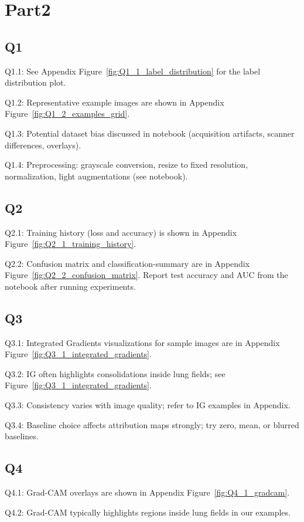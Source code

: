 \section*{Part2}
\subsection*{Q1}
Q1.1: See Appendix Figure~\ref{fig:Q1_1_label_distribution} for the label distribution plot.

Q1.2: Representative example images are shown in Appendix Figure~\ref{fig:Q1_2_examples_grid}.

Q1.3: Potential dataset bias discussed in notebook (acquisition artifacts, scanner differences, overlays).

Q1.4: Preprocessing: grayscale conversion, resize to fixed resolution, normalization, light augmentations (see notebook).

\subsection*{Q2}
Q2.1: Training history (loss and accuracy) is shown in Appendix Figure~\ref{fig:Q2_1_training_history}.

Q2.2: Confusion matrix and classification-summary are in Appendix Figure~\ref{fig:Q2_2_confusion_matrix}. Report test accuracy and AUC from the notebook after running experiments.

\subsection*{Q3}
Q3.1: Integrated Gradients visualizations for sample images are in Appendix Figure~\ref{fig:Q3_1_integrated_gradients}.

Q3.2: IG often highlights consolidations inside lung fields; see Figure~\ref{fig:Q3_1_integrated_gradients}.

Q3.3: Consistency varies with image quality; refer to IG examples in Appendix.

Q3.4: Baseline choice affects attribution maps strongly; try zero, mean, or blurred baselines.

\subsection*{Q4}
Q4.1: Grad-CAM overlays are shown in Appendix Figure~\ref{fig:Q4_1_gradcam}.

Q4.2: Grad-CAM typically highlights regions inside lung fields in our examples.

